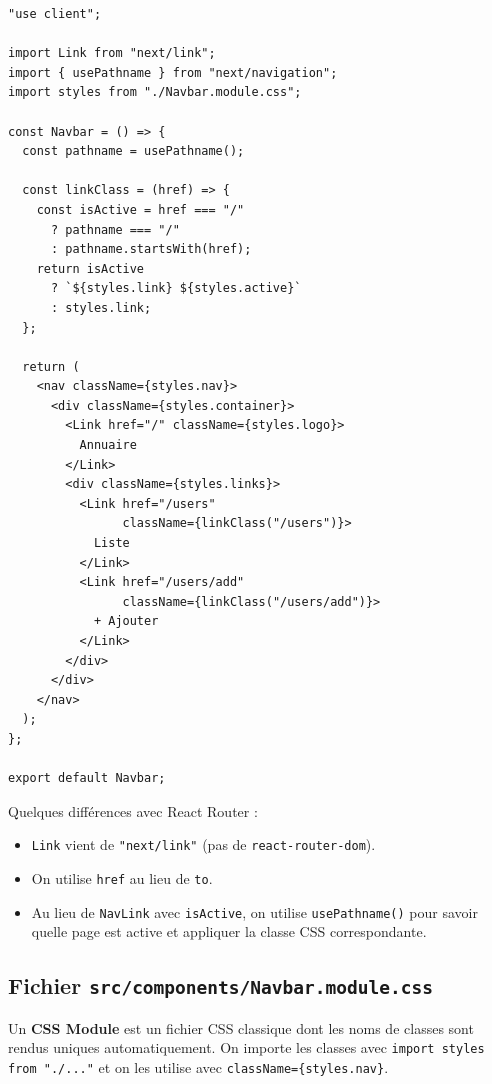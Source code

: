 \documentclass[11pt,a4paper]{article}
\begin{document}
\begin{lstlisting}
"use client";

import Link from "next/link";
import { usePathname } from "next/navigation";
import styles from "./Navbar.module.css";

const Navbar = () => {
  const pathname = usePathname();

  const linkClass = (href) => {
    const isActive = href === "/"
      ? pathname === "/"
      : pathname.startsWith(href);
    return isActive
      ? `${styles.link} ${styles.active}`
      : styles.link;
  };

  return (
    <nav className={styles.nav}>
      <div className={styles.container}>
        <Link href="/" className={styles.logo}>
          Annuaire
        </Link>
        <div className={styles.links}>
          <Link href="/users"
                className={linkClass("/users")}>
            Liste
          </Link>
          <Link href="/users/add"
                className={linkClass("/users/add")}>
            + Ajouter
          </Link>
        </div>
      </div>
    </nav>
  );
};

export default Navbar;
\end{lstlisting}

Quelques différences avec React Router :

\begin{itemize}[nosep]
\item \texttt{Link} vient de \texttt{"next/link"} (pas de \texttt{react-router-dom}).
\item On utilise \texttt{href} au lieu de \texttt{to}.
\item Au lieu de \texttt{NavLink} avec \texttt{isActive}, on utilise \texttt{usePathname()} pour savoir quelle page est active et appliquer la classe CSS correspondante.
\end{itemize}

\subsection{Fichier \texttt{src/components/Navbar.module.css}}

Un \textbf{CSS Module} est un fichier CSS classique dont les noms de classes sont rendus uniques automatiquement. On importe les classes avec \texttt{import styles from "./..."} et on les utilise avec \texttt{className=\{styles.nav\}}.
\end{document}
